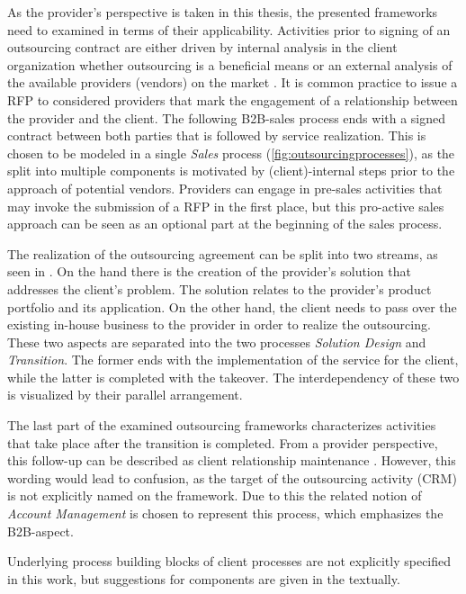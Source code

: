 	As the provider's perspective is taken in this thesis, the presented frameworks need to examined in terms of their applicability. Activities prior to signing of an outsourcing contract are either driven by internal analysis in the client organization whether outsourcing is a beneficial means or an external analysis of the available providers (vendors) on the market \citep{Franceschini_2003}. It is common practice to issue a \acrfull{RFP} to considered providers that mark the engagement of a relationship between the provider and the client. The following B2B-sales process ends with a signed contract between both parties that is followed by service realization. This is chosen to be modeled in a single \textit{Sales} process (\cf \Fig \ref{fig:outsourcingprocesses}), as the split into multiple components is motivated by (client)-internal steps prior to the approach of potential vendors. Providers can engage in pre-sales activities that may invoke the submission of a \acrshort{RFP} in the first place, but this pro-active sales approach can be seen as an optional part at the beginning of the sales process.
	
	The realization of the outsourcing agreement can be split into two streams, as seen in \citep{Agarwal_2008}. On the hand there is the creation of the provider's solution that addresses the client's problem. The solution relates to the provider's product portfolio and its application.  On the other hand, the client needs to pass over the existing in-house business to the provider in order to realize the outsourcing. These two aspects are separated into the two processes \textit{Solution Design} and \textit{Transition}. The former ends with the implementation of the service for the client, while the latter is completed with the takeover. The interdependency of these two is visualized by their parallel arrangement. 
	
	The last part of the examined outsourcing frameworks characterizes activities that take place after the transition is completed. From a provider perspective, this follow-up can be described as client relationship maintenance \citep{Moncrief_2005}. However, this wording would lead to confusion, as the target of the outsourcing activity (\viz \acrshort{CRM}) is not explicitly named on the framework. Due to this the related notion of \textit{Account Management }is chosen to represent this process, which emphasizes the B2B-aspect. 
	
	Underlying process building blocks of client processes are not explicitly specified in this work, but suggestions for components are given in the textually. 
	
